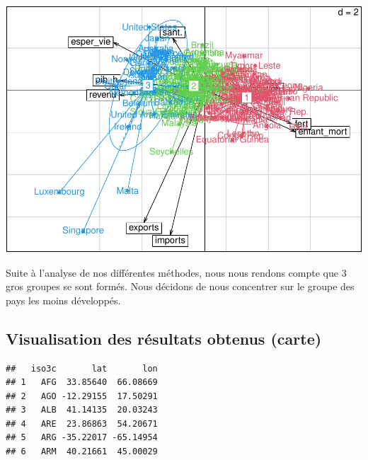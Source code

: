 \documentclass[
]{article}
\begin{document}
\includegraphics{Projet_files/figure-latex/unnamed-chunk-28-1.pdf}

Suite à l'analyse de nos différentes méthodes, nous nous rendons compte
que 3 gros groupes se sont formés. Nous décidons de nous concentrer sur
le groupe des pays les moins développés.

\hypertarget{visualisation-des-ruxe9sultats-obtenus-carte}{%
\subsection{Visualisation des résultats obtenus
(carte)}\label{visualisation-des-ruxe9sultats-obtenus-carte}}

\begin{verbatim}
##   iso3c       lat       lon
## 1   AFG  33.85640  66.08669
## 2   AGO -12.29155  17.50291
## 3   ALB  41.14135  20.03243
## 4   ARE  23.86863  54.20671
## 5   ARG -35.22017 -65.14954
## 6   ARM  40.21661  45.00029
\end{verbatim}
\end{document}
